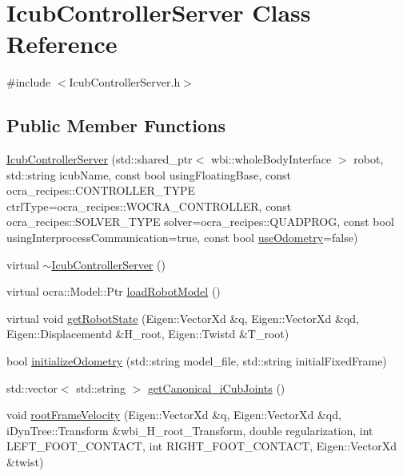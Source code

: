 \hypertarget{classIcubControllerServer}{\section{\-Icub\-Controller\-Server \-Class \-Reference}
\label{classIcubControllerServer}
}


{\ttfamily \#include $<$\-Icub\-Controller\-Server.\-h$>$}

\subsection*{\-Public \-Member \-Functions}
\begin{DoxyCompactItemize}
\item 
\hyperlink{classIcubControllerServer_a6b0a6021e3c82e72ac97ad30d3f0c082}{\-Icub\-Controller\-Server} (std\-::shared\-\_\-ptr$<$ wbi\-::whole\-Body\-Interface $>$ robot, std\-::string icub\-Name, const bool using\-Floating\-Base, const ocra\-\_\-recipes\-::\-C\-O\-N\-T\-R\-O\-L\-L\-E\-R\-\_\-\-T\-Y\-P\-E ctrl\-Type=ocra\-\_\-recipes\-::\-W\-O\-C\-R\-A\-\_\-\-C\-O\-N\-T\-R\-O\-L\-L\-E\-R, const ocra\-\_\-recipes\-::\-S\-O\-L\-V\-E\-R\-\_\-\-T\-Y\-P\-E solver=ocra\-\_\-recipes\-::\-Q\-U\-A\-D\-P\-R\-O\-G, const bool using\-Interprocess\-Communication=true, const bool \hyperlink{classIcubControllerServer_adc410f503b14ed288c01e877ac405114}{use\-Odometry}=false)
\item 
virtual \hyperlink{classIcubControllerServer_a7582d4bbf9851ee9b58913ea2a89e5fd}{$\sim$\-Icub\-Controller\-Server} ()
\item 
virtual ocra\-::\-Model\-::\-Ptr \hyperlink{classIcubControllerServer_a025d8e257a69ef3d2c5a10b3cbfe2350}{load\-Robot\-Model} ()
\item 
virtual void \hyperlink{classIcubControllerServer_ac068c7930f342bb0cb0969d0d04267cf}{get\-Robot\-State} (\-Eigen\-::\-Vector\-Xd \&q, \-Eigen\-::\-Vector\-Xd \&qd, \-Eigen\-::\-Displacementd \&\-H\-\_\-root, \-Eigen\-::\-Twistd \&\-T\-\_\-root)
\item 
bool \hyperlink{classIcubControllerServer_a810f139a27e06458549ccbb3fde12359}{initialize\-Odometry} (std\-::string model\-\_\-file, std\-::string initial\-Fixed\-Frame)
\item 
std\-::vector$<$ std\-::string $>$ \hyperlink{classIcubControllerServer_a892bb43e568d3f112465dff1e0c6b348}{get\-Canonical\-\_\-i\-Cub\-Joints} ()
\item 
void \hyperlink{classIcubControllerServer_a032c035880f8ec2b77ef14521be6e75a}{root\-Frame\-Velocity} (\-Eigen\-::\-Vector\-Xd \&q, \-Eigen\-::\-Vector\-Xd \&qd, i\-Dyn\-Tree\-::\-Transform \&wbi\-\_\-\-H\-\_\-root\-\_\-\-Transform, double regularization, int \-L\-E\-F\-T\-\_\-\-F\-O\-O\-T\-\_\-\-C\-O\-N\-T\-A\-C\-T, int \-R\-I\-G\-H\-T\-\_\-\-F\-O\-O\-T\-\_\-\-C\-O\-N\-T\-A\-C\-T, \-Eigen\-::\-Vector\-Xd \&twist)

\end{DoxyCompactItemize}
